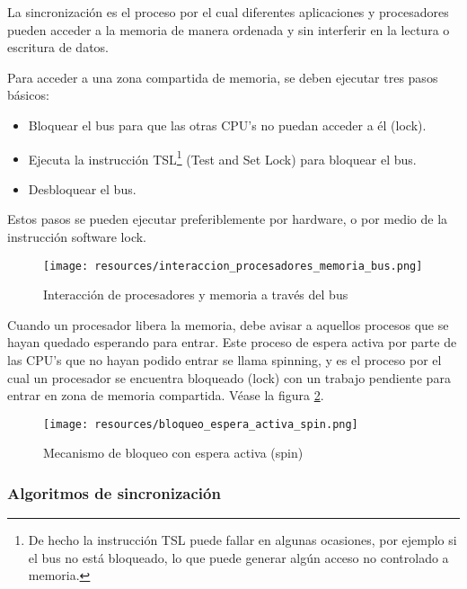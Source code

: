 \documentclass[a4paper, 11pt, titlepage]{article}
\begin{document}
        La sincronización es el proceso por el cual diferentes aplicaciones y procesadores pueden acceder 
        a la memoria de manera ordenada y sin interferir en la lectura o escritura de datos.

        Para acceder a una zona compartida de memoria, se deben ejecutar tres pasos básicos:

        \begin{itemize}
            \item Bloquear el bus para que las otras CPU’s no puedan acceder a él (lock).
            \item Ejecuta la instrucción TSL\footnote{
                De hecho la instrucción TSL puede fallar en algunas ocasiones, por ejemplo si el bus no 
                está bloqueado, lo que puede generar algún acceso no controlado a memoria.
            } (Test and Set Lock) para bloquear el bus. 
            \item Desbloquear el bus.
        \end{itemize}

        Estos pasos se pueden ejecutar preferiblemente por hardware, o por medio de la instrucción
        software lock.

        \begin{figure}[htp]
            \centering
            \texttt{[image: resources/interaccion\_procesadores\_memoria\_bus.png]}
            \caption{Interacción de procesadores y memoria a través del bus}
            \label{interaccion_procesadores_memoria_bus}
        \end{figure}

        Cuando un procesador libera la memoria, debe avisar a aquellos procesos que se hayan quedado 
        esperando para entrar. Este proceso de espera activa por parte de las CPU’s que no hayan podido 
        entrar se llama spinning, y es el proceso por el cual un procesador se encuentra bloqueado 
        (lock) con un trabajo pendiente para entrar en zona de memoria compartida. Véase la figura 
        \ref{bloqueo_espera_activa_spin}.

        \begin{figure}[htp]
            \centering
            \texttt{[image: resources/bloqueo\_espera\_activa\_spin.png]}
            \caption{Mecanismo de bloqueo con espera activa (spin)}
            \label{bloqueo_espera_activa_spin}
        \end{figure}

        \subsubsection{Algoritmos de sincronización}
\end{document}
